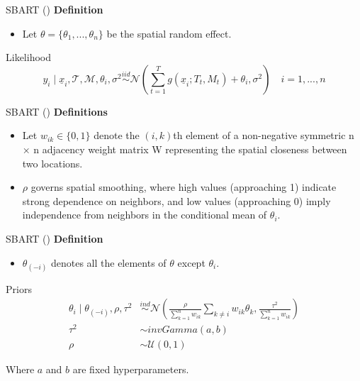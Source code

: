 \documentclass[10pt]{beamer}
\begin{document}
\begin{frame}{SBART (\cite{Muller_2007})}
    \textbf{Definition}
    \begin{itemize}
        \item Let $ \theta = \{ \theta_1,...,\theta_n \} $ be the spatial random effect.
    \end{itemize}

    \begin{block}{Likelihood}
        \begin{equation}
            y_i \mid \underline{x}_i, \mathcal{T}, \mathcal{M}, \theta_i, \sigma^2 \stackrel{iid}{\sim} \mathcal{N}\left(\sum_{t=1}^Tg(\underline{x}_i; T_t, M_t) + \theta_i, \sigma^2 \right) \quad i = 1,...,n
        \end{equation}
    \end{block}
\end{frame}

\begin{frame}{SBART (\cite{Muller_2007})}
    \textbf{Definitions}
    \begin{itemize}
        \item Let $w_{ik} \in \{0,1\}$ denote the $(i, k)$th element of a non-negative symmetric n × n adjacency weight matrix W representing the spatial closeness between two locations.
        \item $\rho$ governs spatial smoothing, where high values (approaching 1) indicate strong dependence on neighbors, and low values (approaching 0) imply independence from neighbors in the conditional mean of $\theta_i$.
    \end{itemize}
\end{frame}

\begin{frame}{SBART (\cite{Muller_2007})}
    \textbf{Definition}
    \begin{itemize}
        \item $\theta_{(-i)}$ denotes all the elements of $\theta$ except $\theta_i$.
    \end{itemize}

    \begin{block}{Priors}
        \begin{align}
            \theta_i \mid \theta_{(-i)}, \rho, \tau^2 &\stackrel{ind}{\sim} \mathcal{N}\left(\frac{\rho}{\sum^n_{k=1}w_{ik}}\sum_{k\neq i}w_{ik}\theta_k,\frac{\tau^2}{\sum_{k=1}^nw_{ik}}\right)\\
            \tau^2 &\sim invGamma(a, b)\\
            \rho &\sim \mathcal{U}(0,1)
        \end{align}
    \end{block}
    Where $a$ and $b$ are fixed hyperparameters.
\end{frame}
\end{document}
